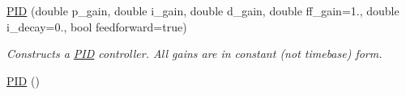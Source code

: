 \begin{DoxyCompactItemize}
\item 
\hyperlink{class_rhesus_1_1_toolkit_1_1_control_1_1_p_i_d_a53bb6d44ce9c59fa6b96a9767c881264}{P\-I\-D} (double p\-\_\-gain, double i\-\_\-gain, double d\-\_\-gain, double ff\-\_\-gain=1., double i\-\_\-decay=0., bool feedforward=true)
\begin{DoxyCompactList}\small\item\em Constructs a \hyperlink{class_rhesus_1_1_toolkit_1_1_control_1_1_p_i_d}{P\-I\-D} controller. All gains are in constant (not timebase) form. \end{DoxyCompactList}\item 
\hypertarget{class_rhesus_1_1_toolkit_1_1_control_1_1_p_i_d_a0311b6f7de348499ce24e53ba353514a}{\hyperlink{class_rhesus_1_1_toolkit_1_1_control_1_1_p_i_d_a0311b6f7de348499ce24e53ba353514a}{P\-I\-D} ()}\label{class_rhesus_1_1_toolkit_1_1_control_1_1_p_i_d_a0311b6f7de348499ce24e53ba353514a}


\end{DoxyCompactItemize}
